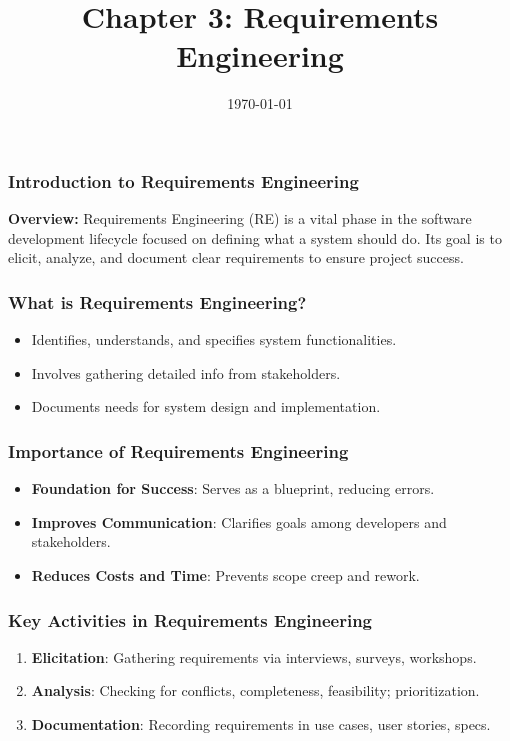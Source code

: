 \documentclass{beamer}
\title{Chapter 3: Requirements Engineering}
\author{}
\institute{}
\date{\today}
\begin{document}
\frame{\titlepage}

\begin{frame}[fragile]
    \frametitle{Introduction to Requirements Engineering}
    \textbf{Overview:} Requirements Engineering (RE) is a vital phase in the software development lifecycle focused on defining what a system should do. Its goal is to elicit, analyze, and document clear requirements to ensure project success.
\end{frame}

\begin{frame}[fragile]
    \frametitle{What is Requirements Engineering?}
    \begin{itemize}
        \item Identifies, understands, and specifies system functionalities.
        \item Involves gathering detailed info from stakeholders.
        \item Documents needs for system design and implementation.
    \end{itemize}
\end{frame}

\begin{frame}[fragile]
    \frametitle{Importance of Requirements Engineering}
    \begin{itemize}
        \item \textbf{Foundation for Success}: Serves as a blueprint, reducing errors.
        \item \textbf{Improves Communication}: Clarifies goals among developers and stakeholders.
        \item \textbf{Reduces Costs and Time}: Prevents scope creep and rework.
    \end{itemize}
\end{frame}

\begin{frame}[fragile]
    \frametitle{Key Activities in Requirements Engineering}
    \begin{enumerate}
        \item \textbf{Elicitation}: Gathering requirements via interviews, surveys, workshops.
        \item \textbf{Analysis}: Checking for conflicts, completeness, feasibility; prioritization.
        \item \textbf{Documentation}: Recording requirements in use cases, user stories, specs.
    \end{enumerate}
\end{frame}
\end{document}
